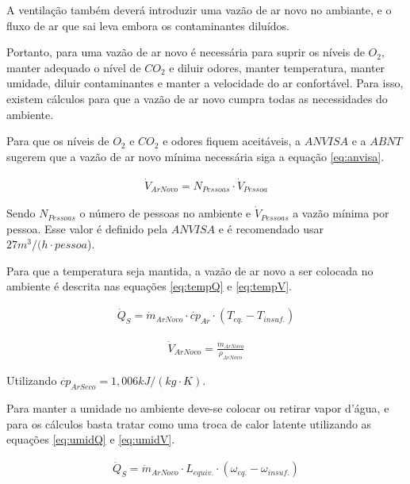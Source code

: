 \documentclass[acronym,symbols]{fei}
\begin{document}
A ventilação também deverá introduzir uma vazão de ar novo no ambiante, e o fluxo de ar que sai leva embora os contaminantes diluídos. 

Portanto, para uma vazão de ar novo é necessária para suprir os níveis de $O_2$, manter adequado o nível de $CO_2$ e diluir odores, manter temperatura, manter umidade, diluir contaminantes e manter a velocidade do ar confortável. Para isso, existem cálculos para que a vazão de ar novo cumpra todas as necessidades do ambiente.

Para que os níveis de $O_2$ e $CO_2$ e odores fiquem aceitáveis, a $ANVISA$ e a $ABNT$ sugerem que a vazão de ar novo mínima necessária siga a equação \ref{eq:anvisa}.

\begin{equation} \label{eq:anvisa}
\begin{aligned}
    \dot{V}_{ArNovo}=N_{Pessoas}\cdot {\dot{V}_{Pessoa}}
\end{aligned}
\end{equation}

Sendo $N_{Pessoas}$ o número de pessoas no ambiente e $\dot{V}_{Pessoas}$ a vazão mínima por pessoa. Esse valor é definido pela $ANVISA$ e é recomendado usar $27 m^3/(h\cdot{pessoa}$).

Para que a temperatura seja mantida, a vazão de ar novo a ser colocada no ambiente é descrita nas equações \ref{eq:tempQ} e \ref{eq:tempV}.

\begin{equation} \label{eq:tempQ}
\begin{aligned}
    \dot{Q}_{S}=\dot{m}_{ArNovo}\cdot {\dot{cp}_{Ar}}\cdot({T_{eq.}-T_{insuf.}})
\end{aligned}
\end{equation}

\begin{equation} \label{eq:tempV}
\begin{aligned}
    \dot{V}_{ArNovo}=\frac{\dot{m}_{ArNovo}}{\rho_{ArNovo}}
\end{aligned}
\end{equation}

Utilizando $\dot{cp}_{ArSeco}=1,006 kJ/(kg\cdot{K})$.

Para manter a umidade no ambiente deve-se colocar ou retirar vapor d'água, e para os cálculos basta tratar como uma troca de calor latente utilizando as equações \ref{eq:umidQ} e \ref{eq:umidV}.

\begin{equation} \label{eq:umidQ}
\begin{aligned}
    \dot{Q}_{S}=\dot{m}_{ArNovo}\cdot {{L}_{equiv.}}\cdot({\omega_{eq.}-\omega_{insuf.}})
\end{aligned}
\end{equation}
\end{document}
